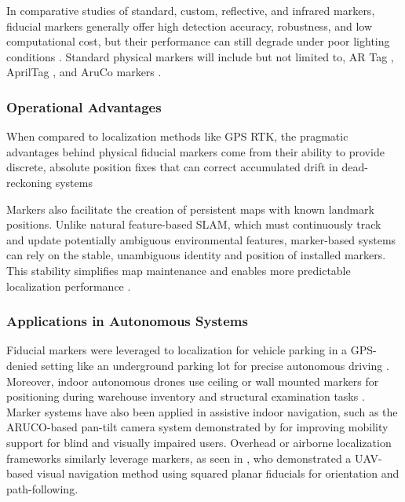 In comparative studies of standard, custom, reflective, and infrared markers, fiducial markers generally offer high detection accuracy, robustness, and low computational cost, but their performance can still degrade under poor lighting conditions \cite{Alghamdi2025MobileRobotMarkersMapping}. Standard physical markers will include but not limited to, AR Tag \citep{Fiala2005ARTag}, AprilTag \citep{Olson2011AprilTag}, and AruCo markers \citep{GarridoJurado2014FiducialMarkers}.


\subsubsection{Operational Advantages}
When compared to localization methods like GPS RTK, the pragmatic advantages behind physical fiducial markers come from their ability to provide discrete, absolute position fixes that can correct accumulated drift in dead-reckoning systems \citep{Park2023FusionLocalizationAirplane, Xu2023VisualNavigationUAV}

Markers also facilitate the creation of persistent maps with known landmark positions. Unlike natural feature-based SLAM, which must continuously track and update potentially ambiguous environmental features, marker-based systems can rely on the stable, unambiguous identity and position of installed markers. This stability simplifies map maintenance and enables more predictable localization performance \citep{MunozSalinas2018SPMSLAM, Pfrommer2019TagSLAM, Wang_Zhang_Zhu_Hu_Deng_He_Kang_2023}. 

\subsubsection{Applications in Autonomous Systems}
Fiducial markers were leveraged to localization for vehicle parking in a GPS-denied setting like an underground parking lot for precise autonomous driving \citep{Fang2020MarkerValetParking}. Moreover, indoor autonomous drones use ceiling or wall mounted markers for positioning during warehouse inventory and structural examination tasks \citep{Nahangi2018UAVFiducialConstruction}. Marker systems have also been applied in assistive indoor navigation, such as the ARUCO-based pan-tilt camera system demonstrated by \cite{Adapa2019AutonomousMapping} for improving mobility support for blind and visually impaired users. Overhead or airborne localization frameworks similarly leverage markers, as seen in \cite{Xu2023VisualNavigationUAV}, who demonstrated a UAV-based visual navigation method using squared planar fiducials for orientation and path-following.

